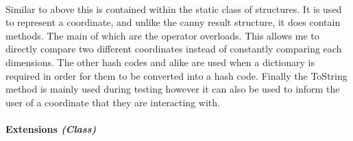 \begin{FlushLeft}
\begin{enumerate}
    \begin{figure}[H]
        \centering
    \end{figure}\\

    Similar to above this is contained within the static class of structures. It is used to represent a coordinate, and unlike the canny result structure, it does contain methods. The main of which are the operator overloads. This allows me to directly compare two different coordinates instead of constantly comparing each dimensions. The other hash codes and alike are used when a dictionary is required in order for them to be converted into a hash code. Finally the ToString method is mainly used during testing however it can also be used to inform the user of a coordinate that they are interacting with.

    \bk

    \paragraph*{Extensions \textit{(Class)}} \mbox{} \\

    \begin{figure}[H]
        \centering
    \end{figure}\\


\end{enumerate}
\end{FlushLeft}
